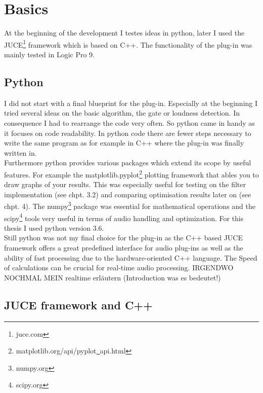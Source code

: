 \chapter{Basics}
\label{chapter:basics}

At the beginning of the development I testes ideas in python, later I used the JUCE\footnote{juce.com} framework which is based on C++. The functionality of the plug-in was mainly tested in Logic Pro 9.\\

\section{Python}

I did not start with a final blueprint for the plug-in. Especially at the beginning I tried several ideas on the basic algorithm, the gate or loudness detection. In consequence I had to rearrange the code very often. So python came in handy as it focuses on code readability. In python code there are fewer steps necessary to write the same program as for example in C++ where the plug-in was finally written in.\\
Furthermore python provides various packages which extend its scope by useful features. For example the matplotlib.pyplot\footnote{matplotlib.org/api/pyplot\underline{\ }api.html} plotting framework that ables you to draw graphs of your results. This was especially useful for testing on the filter implementation (see chpt. 3.2) and comparing optimisation results later on (see chpt. 4). The numpy\footnote{numpy.org} package was essential for mathematical operations and the scipy\footnote{scipy.org} tools very useful in terms of audio handling and optimization. For this thesis I used python version 3.6.\\
Still python was not my final choice for the plug-in as the C++ based JUCE framework offers a great predefined interface for audio plug-ins as well as the ability of fast processing due to the hardware-oriented C++ language.  The Speed of calculations can be crucial for real-time audio processing. IRGENDWO NOCHMAL MEIN realtime erläutern (Introduction was es bedeutet!)\\

\section{JUCE framework and C++}

